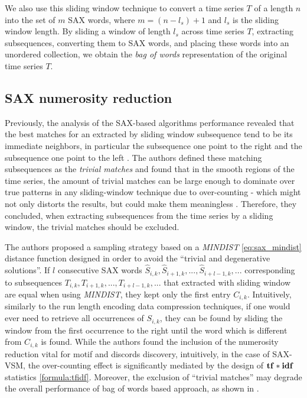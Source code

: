 We also use this sliding window technique to convert a time series $T$ of a length $n$ into 
the set of $m$ SAX words, where $m=(n-l_{s})+1$ and $l_{s}$ is the sliding window length. 
By sliding a window of length $l_{s}$ across time series $T$, extracting subsequences, 
converting them to SAX words, and placing these words into an unordered collection, 
we obtain the \textit{bag of words} representation of the original time series $T$.

\subsection{SAX numerosity reduction}\label{section_numerosity_reduction}
Previously, the analysis of the SAX-based algorithms performance revealed that the best matches for an extracted 
by sliding window subsequence tend to be its immediate neighbors, in particular the subsequence one point to the 
right and the subsequence one point to the left \cite{citeulike:3977965} \cite{citeulike:3175749}. 
The authors defined these matching subsequences as the \textit{trivial matches} and found that in the smooth regions
of the time series, the amount of trivial matches can be large enough to dominate over true patterns in any 
sliding-window technique due to over-counting - which might not only distorts the results, but could make them 
meaningless \cite{citeulike:227029}. 
Therefore, they concluded, when extracting subsequences from the time series by a sliding window, the trivial 
matches should be excluded. 

The authors proposed a sampling strategy based on a \textit{MINDIST} \ref{eq:sax_mindist} distance function designed 
in order to avoid the ``trivial and degenerative solutions''.
If $l$ consecutive SAX words \newline $\widehat{S}_{i,k}, \widehat{S}_{i+1,k},...,\widehat{S}_{i+l-1,k},...$
corresponding to subsequences $T_{i,k}, T_{i+1,k},...,T_{i+l-1,k},...$ that extracted with sliding window are 
equal when using \textit{MINDIST}, they kept only the first entry $C_{i,k}$. 
Intuitively, similarly to the run length encoding data compression techniques, if one would ever need to 
retrieve all occurrences of $S_{i,k}$, they can be found by sliding the window from the first occurrence to the right
until the word which is different from $C_{i,k}$ is found. 
While the authors found the inclusion of the numerosity reduction vital for motif and discords discovery, intuitively, 
in the case of SAX-VSM, the over-counting effect is significantly mediated by the design of 
$\text{\textbf{tf}}\ast\text{\textbf{idf}}$ statistics \eqref{formula:tfidf}. 
Moreover, the exclusion of ``trivial matches'' may degrade the overall performance of bag of words based 
approach, as shown in \cite{citeulike:10525778}.


